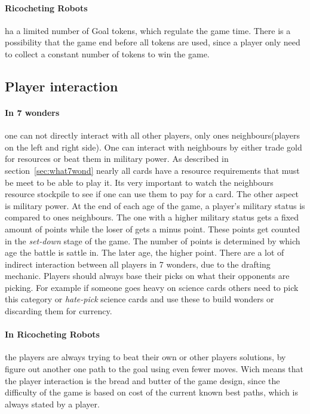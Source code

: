 \documentclass[a4paper]{article}
\begin{document}
\paragraph{Ricocheting Robots} ha a limited number of Goal tokens, which regulate the game time. There is a possibility that the game end before all tokens are used, since a player only need to collect a constant number of tokens to win the game.

\subsection{Player interaction}

\paragraph{In 7 wonders} one can not directly interact with all other players, only ones neighbours(players on the left and right side). One can interact with neighbours by either trade gold for resources or beat them in military power. As described in section~\ref{sec:what7wond} nearly all cards have a resource requirements that must be meet to be able to play it. Its very important to watch the neighbours resource stockpile to see if one can use them to pay for a card. The other aspect is military power. At the end of each age of the game, a player's military status is compared to ones neighbours. The one with a higher military status gets a fixed amount of points while the loser of gets a minus point. These points get counted in the \textit{set-down} stage of the game. The number of points is determined by which age the battle is sattle in. The later age, the higher point. 
There are a lot of indirect interaction between all players in 7 wonders, due to the drafting mechanic. Players should always base their picks on what their opponents are picking. For example if someone goes heavy on science cards others need to pick this category or \textit{hate-pick} science cards and use these to build wonders or discarding them for currency.

\paragraph{In Ricocheting Robots} the players are always trying to beat their own or other players solutions, by figure out another one path to the goal using even fewer moves. Wich means that the player interaction is the bread and butter of the game design, since the difficulty of the game is based on cost of the current known best paths, which is always stated by a player.
\end{document}
